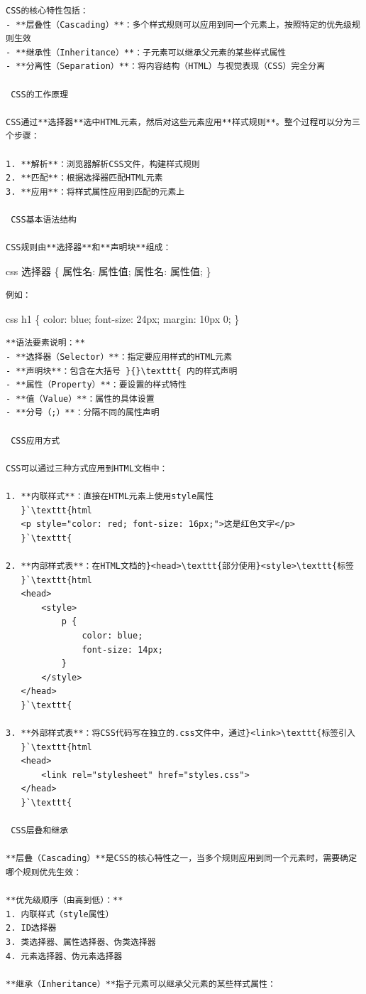 \begin{lstlisting}
CSS的核心特性包括：
- **层叠性（Cascading）**：多个样式规则可以应用到同一个元素上，按照特定的优先级规则生效
- **继承性（Inheritance）**：子元素可以继承父元素的某些样式属性
- **分离性（Separation）**：将内容结构（HTML）与视觉表现（CSS）完全分离

 CSS的工作原理

CSS通过**选择器**选中HTML元素，然后对这些元素应用**样式规则**。整个过程可以分为三个步骤：

1. **解析**：浏览器解析CSS文件，构建样式规则
2. **匹配**：根据选择器匹配HTML元素
3. **应用**：将样式属性应用到匹配的元素上

 CSS基本语法结构

CSS规则由**选择器**和**声明块**组成：
\end{lstlisting}

css 选择器 \{ 属性名: 属性值; 属性名: 属性值; \}

\begin{lstlisting}
例如：
\end{lstlisting}

css h1 \{ color: blue; font-size: 24px; margin: 10px 0; \}

\begin{lstlisting}
**语法要素说明：**
- **选择器（Selector）**：指定要应用样式的HTML元素
- **声明块**：包含在大括号 }{}\texttt{ 内的样式声明
- **属性（Property）**：要设置的样式特性
- **值（Value）**：属性的具体设置
- **分号（;）**：分隔不同的属性声明

 CSS应用方式

CSS可以通过三种方式应用到HTML文档中：

1. **内联样式**：直接在HTML元素上使用style属性
   }`\texttt{html
   <p style="color: red; font-size: 16px;">这是红色文字</p>
   }`\texttt{

2. **内部样式表**：在HTML文档的}<head>\texttt{部分使用}<style>\texttt{标签
   }`\texttt{html
   <head>
       <style>
           p {
               color: blue;
               font-size: 14px;
           }
       </style>
   </head>
   }`\texttt{

3. **外部样式表**：将CSS代码写在独立的.css文件中，通过}<link>\texttt{标签引入
   }`\texttt{html
   <head>
       <link rel="stylesheet" href="styles.css">
   </head>
   }`\texttt{

 CSS层叠和继承

**层叠（Cascading）**是CSS的核心特性之一，当多个规则应用到同一个元素时，需要确定哪个规则优先生效：

**优先级顺序（由高到低）：**
1. 内联样式（style属性）
2. ID选择器
3. 类选择器、属性选择器、伪类选择器
4. 元素选择器、伪元素选择器

**继承（Inheritance）**指子元素可以继承父元素的某些样式属性：
\end{lstlisting}


